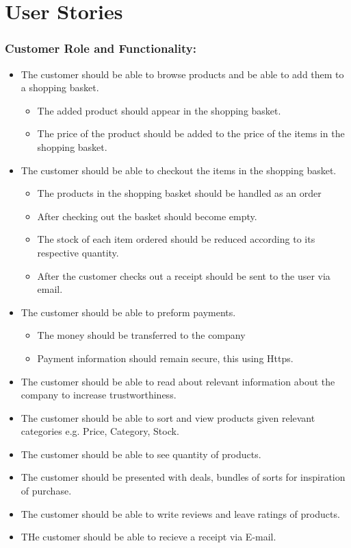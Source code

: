 \newpage

\section{User Stories}\label{app:user_stories}

\subsubsection{Customer Role and Functionality:}

\begin{itemize}
    \item The customer should be able to browse products and be able to add
    them to a shopping basket.
    \begin{itemize}
        \item The added product should appear in the shopping basket.
        \item The price of the product should be added to the price of the
        items in the shopping basket.
    \end{itemize}
\item The customer should be able to checkout the items in the shopping basket.
    \begin{itemize}
        \item The products in the shopping basket should be handled as an order
        \item After checking out the basket should become empty.
        \item The stock of each item ordered should be reduced according to
        its respective quantity.
        \item After the customer checks out a receipt should be sent to the
        user via email.
    \end{itemize}
\item The customer should be able to preform payments.
    \begin{itemize}
        \item The money should be transferred to the company
        \item Payment information should remain secure, this using Https.
    \end{itemize}
    \item The customer should be able to read about relevant information
    about the company to increase trustworthiness.
    \item The customer should be able to sort and view  products given
    relevant categories e.g. Price, Category, Stock.
    \item The customer should be able to see quantity of products. 
    \item The customer should be presented with deals, bundles of sorts for
    inspiration of purchase.
    \item The customer should be able to write reviews and leave ratings
    of products.
    \item THe customer should be able to recieve a receipt via E-mail. 
\end{itemize}

